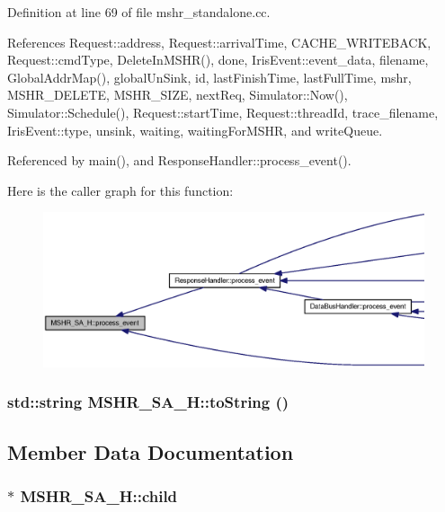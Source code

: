Definition at line 69 of file mshr\_\-standalone.cc.

References Request::address, Request::arrivalTime, CACHE\_\-WRITEBACK, Request::cmdType, DeleteInMSHR(), done, IrisEvent::event\_\-data, filename, GlobalAddrMap(), globalUnSink, id, lastFinishTime, lastFullTime, mshr, MSHR\_\-DELETE, MSHR\_\-SIZE, nextReq, Simulator::Now(), Simulator::Schedule(), Request::startTime, Request::threadId, trace\_\-filename, IrisEvent::type, unsink, waiting, waitingForMSHR, and writeQueue.

Referenced by main(), and ResponseHandler::process\_\-event().

Here is the caller graph for this function:\nopagebreak
\begin{figure}[H]
\begin{center}
\leavevmode
\includegraphics[width=420pt]{classMSHR__SA__H_7258ebdeaf1a298f05ec66556233f16a_icgraph}
\end{center}
\end{figure}
\subsubsection[{toString}]{\setlength{\rightskip}{0pt plus 5cm}std::string MSHR\_\-SA\_\-H::toString ()}\label{classMSHR__SA__H_d4dd958add3f62a1636f1f7d3be1e928}




\subsection{Member Data Documentation}
\subsubsection[{child}]{$\ast$ {\bf MSHR\_\-SA\_\-H::child}}\label{classMSHR__SA__H_83132f931ecc75f677f503097acf25d5}





